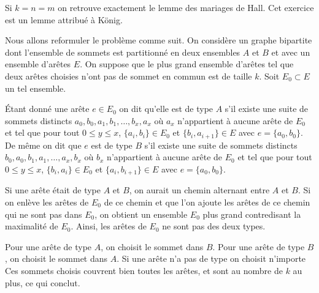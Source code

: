 \begin{sol}
Si $k = n = m$ on retrouve exactement le lemme des mariages de Hall. Cet exercice est un lemme attribué à König.

\medskip

Nous allons reformuler le problème comme suit. On considère un graphe bipartite dont l'ensemble de sommets est partitionné en deux ensembles $A$ et $B$ et avec un ensemble d'arêtes $E$. On suppose que le plus grand ensemble d'arêtes tel que deux arêtes choisies n'ont pas de sommet en commun est de taille $k$. Soit $E_0 \subset E$ un tel ensemble.

\medskip

Étant donné une arête $e \in E_0$ on dit qu'elle est de type $A$ s'il existe une suite de sommets distincts $a_0, b_0, a_1, b_1, \dots, b_x, a_x$ où $a_x$ n'appartient à aucune arête de $E_0$ et tel que pour tout $0 \le y \le x$, $\{a_i, b_i\} \in E_0$ et $\{b_i, a_{i + 1}\} \in E$ avec $e = \{a_0, b_0\}$. De même on dit que $e$ est de type $B$ s'il existe une suite de sommets distincts $b_0, a_0, b_1, a_1, \dots, a_x, b_x$ où $b_x$ n'appartient à aucune arête de $E_0$ et tel que pour tout $0 \le y \le x$, $\{b_i, a_i\} \in E_0$ et $\{a_i, b_{i + 1}\} \in E$ avec $e = \{a_0, b_0\}$.

\medskip

Si une arête était de type $A$ et $B$, on aurait un chemin alternant entre $A$ et $B$. Si on enlève les arêtes de $E_0$ de ce chemin et que l'on ajoute les arêtes de ce chemin qui ne sont pas dans $E_0$, on obtient un ensemble $E_0$ plus grand contredisant la maximalité de $E_0$. Ainsi, les arêtes de $E_0$ ne sont pas des deux types.

\medskip

Pour une arête de type $A$, on choisit le sommet dans $B$. Pour une arête de type $B$, on choisit le sommet dans $A$. Si une arête n'a pas de type on choisit n'importe Ces sommets choisis couvrent bien toutes les arêtes, et sont au nombre de $k$ au plus, ce qui conclut.
\end{sol}


